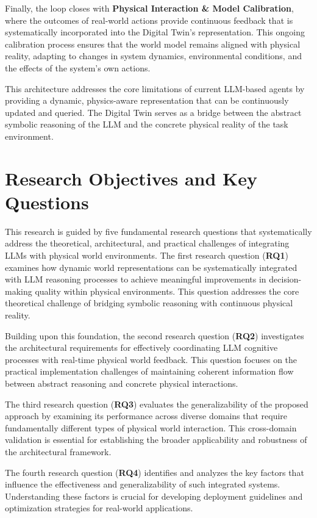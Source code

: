 Finally, the loop closes with \textbf{Physical Interaction \& Model Calibration}, where the outcomes of real-world actions provide continuous feedback that is systematically incorporated into the Digital Twin's representation. This ongoing calibration process ensures that the world model remains aligned with physical reality, adapting to changes in system dynamics, environmental conditions, and the effects of the system's own actions.

This architecture addresses the core limitations of current LLM-based agents by providing a dynamic, physics-aware representation that can be continuously updated and queried. The Digital Twin serves as a bridge between the abstract symbolic reasoning of the LLM and the concrete physical reality of the task environment.

\section{Research Objectives and Key Questions}

This research is guided by five fundamental research questions that systematically address the theoretical, architectural, and practical challenges of integrating LLMs with physical world environments. The first research question (\textbf{RQ1}) examines how dynamic world representations can be systematically integrated with LLM reasoning processes to achieve meaningful improvements in decision-making quality within physical environments. This question addresses the core theoretical challenge of bridging symbolic reasoning with continuous physical reality.

Building upon this foundation, the second research question (\textbf{RQ2}) investigates the architectural requirements for effectively coordinating LLM cognitive processes with real-time physical world feedback. This question focuses on the practical implementation challenges of maintaining coherent information flow between abstract reasoning and concrete physical interactions.

The third research question (\textbf{RQ3}) evaluates the generalizability of the proposed approach by examining its performance across diverse domains that require fundamentally different types of physical world interaction. This cross-domain validation is essential for establishing the broader applicability and robustness of the architectural framework.

The fourth research question (\textbf{RQ4}) identifies and analyzes the key factors that influence the effectiveness and generalizability of such integrated systems. Understanding these factors is crucial for developing deployment guidelines and optimization strategies for real-world applications.

